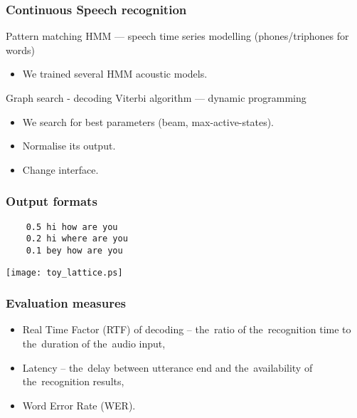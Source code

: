 \begin{frame}\frametitle{Continuous Speech recognition} 
    \begin{block}{Pattern matching}
        HMM --- speech time series modelling (phones/triphones for words)
        \begin{itemize}
            \item We trained several HMM acoustic models.
        \end{itemize}
    \end{block}
    \begin{exampleblock}{Graph search - decoding}
        Viterbi algorithm --- dynamic programming
        \begin{itemize}
            \item We search for best parameters (beam, max-active-states).
            \item Normalise its output.
            \item Change interface.
        \end{itemize}
    \end{exampleblock}
\end{frame}


\begin{frame}[fragile]\frametitle{Output formats} 

\begin{verbatim}
    0.5 hi how are you
    0.2 hi where are you
    0.1 bey how are you
\end{verbatim}

    \begin{center}
        \texttt{[image: toy\_lattice.ps]}
    \end{center}
\end{frame}

\begin{frame}\frametitle{Evaluation measures} 
    \begin{itemize}
        \item Real Time Factor (RTF) of decoding -- the~ratio of the~recognition time to the~duration of the~audio input,
        \item Latency -- the~delay between utterance end and the~availability of the~recognition results,
        \item Word Error Rate (WER).
    \end{itemize}
\end{frame}


